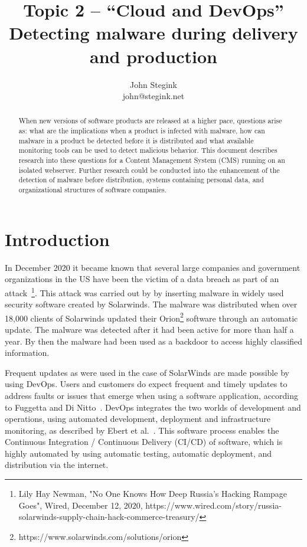 \documentclass[a4paper, 10pt, conference]{ieeeconf}
\title{Topic 2 -- ``Cloud and DevOps''
	\\{Detecting malware during delivery and production } 
	}
\author{John Stegink \\
  {john@stegink.net}
}
\begin{document}
\maketitle


\begin{abstract}
When new versions of software products are released at a higher pace, questions arise as: what are the implications when a product is infected with malware, how can malware in a product be detected before it is distributed and what available monitoring tools can be used to detect malicious behavior. This document describes research into these questions for a Content Management System (CMS) running on an isolated webserver. Further research could be conducted into the enhancement of the detection of malware before distribution, systems containing personal data, and organizational structures of software companies.
\end{abstract}


\section{Introduction}

In December 2020 it became known that several large companies and government organizations in the US have been the victim of a data breach as part of an attack~\footnote{Lily Hay Newman, "No One Knows How Deep Russia's Hacking Rampage Goes", Wired, December 12, 2020, https://www.wired.com/story/russia-solarwinds-supply-chain-hack-commerce-treasury/}. This attack was carried out by by inserting malware in widely used security software created by Solarwinds. The malware was distributed when over 18,000 clients of Solarwinds updated their Orion\footnote{https://www.solarwinds.com/solutions/orion} software through an automatic update. The malware was detected after it had been active for more than half a year. By then the malware had been used as a backdoor to access highly classified information.

Frequent updates as were used in the case of SolarWinds are made possible by using DevOps. Users and customers do expect frequent and timely updates to address faults or issues that emerge when using a software application, according to Fuggetta and Di Nitto~\cite{fuggetta2014software}. DevOps integrates the two worlds of development and operations, using automated development, deployment and infrastructure monitoring, as described by Ebert et al.~\cite{7458761}. This software process enables the Continuous Integration / Continuous Delivery (CI/CD) of software, which is highly automated by using automatic testing, automatic deployment, and distribution via the internet. 
\end{document}
